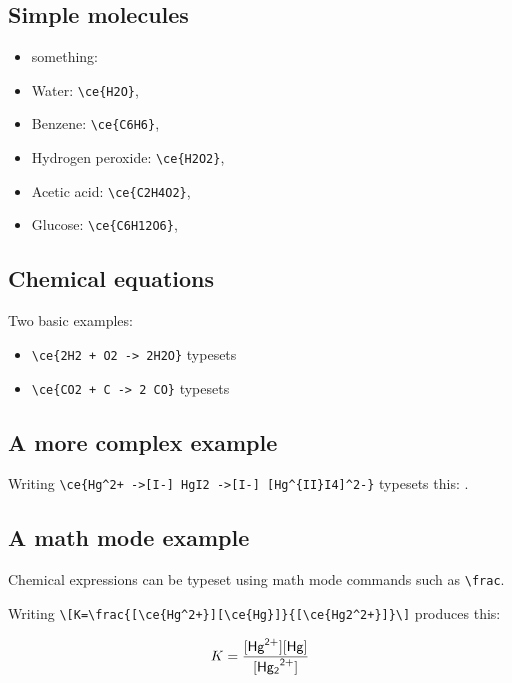\documentclass{article}
\begin{document}
\subsection*{Simple molecules}

\begin{itemize}
\item something: 
\item Water: \verb|\ce{H2O}|, 
\item Benzene: \verb|\ce{C6H6}|, 
\item Hydrogen peroxide: \verb|\ce{H2O2}|, 
\item Acetic acid: \verb|\ce{C2H4O2}|, 
\item Glucose: \verb|\ce{C6H12O6}|, 
\end{itemize}

\subsection*{Chemical equations}

Two basic examples:

\begin{itemize}
\item \verb|\ce{2H2 + O2 -> 2H2O}| typesets 
\item \verb|\ce{CO2 + C -> 2 CO}| typesets 
\end{itemize}

\subsection*{A more complex example}

Writing \verb|\ce{Hg^2+ ->[I-] HgI2 ->[I-] [Hg^{II}I4]^2-}| typesets this:\vskip10pt
\noindent {}.

\subsection*{A math mode example}

Chemical expressions can be typeset using math mode commands such as \verb|\frac|. \vskip10pt

\noindent Writing \verb|\[K=\frac{[\ce{Hg^2+}][\ce{Hg}]}{[\ce{Hg2^2+}]}\]| produces this:

\[K=\frac{[\ce{Hg^2+}][\ce{Hg}]}{[\ce{Hg2^2+}]}\]
\end{document}
